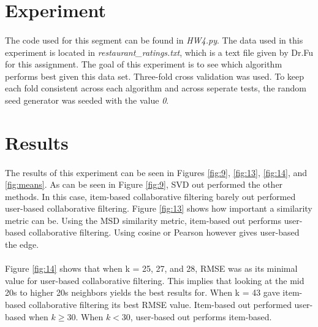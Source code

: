 \documentclass[times]{article}
\begin{document}
	\section{Experiment}
		\paragraph{}
		The code used for this segment can be found in \textit{HW4.py}. The data used in this experiment is located in \textit{restaurant\_ratings.txt}, which is a text file given by Dr.Fu for this assignment. The goal of this experiment is to see which algorithm performs best given this data set. Three-fold cross validation was used. To keep each fold consistent across each algorithm and across seperate tests, the random seed generator was seeded with the value \textit{0}. 

	\section{Results}
		\paragraph{}
		The results of this experiment can be seen in Figures \ref{fig:9}, \ref{fig:13}, \ref{fig:14}, and \ref{fig:means}. As can be seen in Figure \ref{fig:9}, SVD out performed the other methods. In this case, item-based collaborative filtering barely out performed user-based collaborative filtering. Figure \ref{fig:13} shows how important a similarity metric can be. Using the MSD similarity metric, item-based out performs user-based collaborative filtering. Using cosine or Pearson however gives user-based the edge. 

		\paragraph{}
		Figure \ref{fig:14} shows that when k = 25, 27, and 28, RMSE was as its minimal value for user-based collaborative filtering. This implies that looking at the mid 20s to higher 20s neighbors yields the best results for. When k = 43 gave item-based collaborative filtering its best RMSE value. Item-based out performed user-based when $k \geq 30$. When $k < 30$, user-based out performs item-based. 
\end{document}

